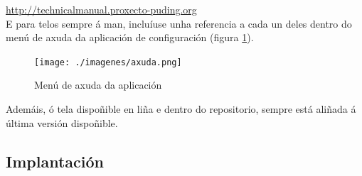  \url{http://technicalmanual.proxecto-puding.org} \\
 
 E para telos sempre á man, incluíuse unha referencia a cada un deles dentro do
 menú de axuda da aplicación de configuración (figura \ref{figura:Axuda}). \\
 
 \begin{figure}[htbp]
  \centering
  \texttt{[image: ./imagenes/axuda.png]}
  \caption{Menú de axuda da aplicación}
  \label{figura:Axuda}
 \end{figure}
 
 Ademáis, ó tela dispoñible en liña e dentro do repositorio, sempre está aliñada
 á última versión dispoñible.
 
 \subsection{Implantación}
 
